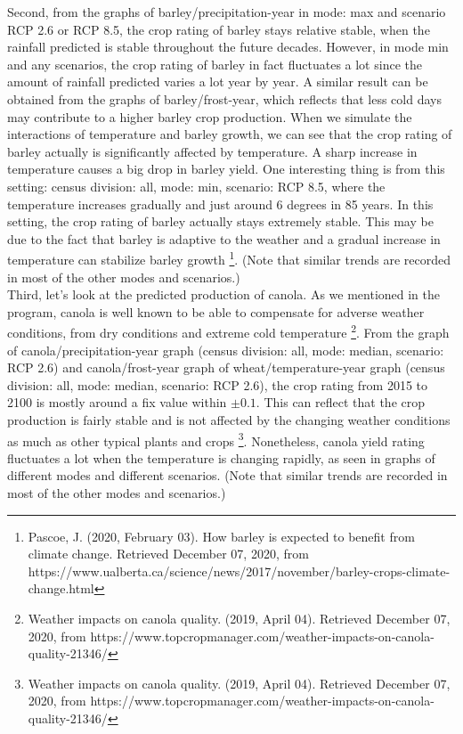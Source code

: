 \documentclass[fontsize=11pt]{article}
\begin{document}
Second, from the graphs of barley/precipitation-year in mode: max and scenario RCP 2.6 or RCP 8.5, the crop rating of barley stays relative stable, when the rainfall predicted is stable throughout the future decades. However, in mode min and any scenarios, the crop rating of barley in fact fluctuates a lot since the amount of rainfall predicted varies a lot year by year. A similar result can be obtained from the graphs of barley/frost-year, which reflects that less cold days may contribute to a higher barley crop production. When we simulate the interactions of temperature and barley growth, we can see that the crop rating of barley actually is significantly affected by temperature. A sharp increase in temperature causes a big drop in barley yield. One interesting thing is from this setting: census division: all, mode: min, scenario: RCP 8.5, where the temperature increases gradually and just around 6 degrees in 85 years. In this setting, the crop rating of barley actually stays extremely stable. This may be due to the fact that barley is adaptive to the weather and a gradual increase in temperature can stabilize barley growth \footnote{Pascoe, J. (2020, February 03). How barley is expected to benefit from climate change. Retrieved December 07, 2020, from https://www.ualberta.ca/science/news/2017/november/barley-crops-climate-change.html}.
(Note that similar trends are recorded in most of the other modes and scenarios.) \\

Third, let's look at the predicted production of canola. As we mentioned in the program, canola is well known to be able to compensate for adverse weather conditions, from dry conditions and extreme cold temperature \footnote{Weather impacts on canola quality. (2019, April 04). Retrieved December 07, 2020, from https://www.topcropmanager.com/weather-impacts-on-canola-quality-21346/}. From the graph of canola/precipitation-year graph (census division: all, mode: median, scenario: RCP 2.6) and canola/frost-year graph of wheat/temperature-year graph (census division: all, mode: median, scenario: RCP 2.6), the crop rating from 2015 to 2100 is mostly around a fix value within $\pm 0.1$. This can reflect that the crop production is fairly stable and is not affected by the changing weather conditions as much as other typical plants and crops \footnote{Weather impacts on canola quality. (2019, April 04). Retrieved December 07, 2020, from https://www.topcropmanager.com/weather-impacts-on-canola-quality-21346/}. Nonetheless, canola yield rating fluctuates a lot when the temperature is changing rapidly, as seen in graphs of different modes and different scenarios.
(Note that similar trends are recorded in most of the other modes and scenarios.)\\
\end{document}
